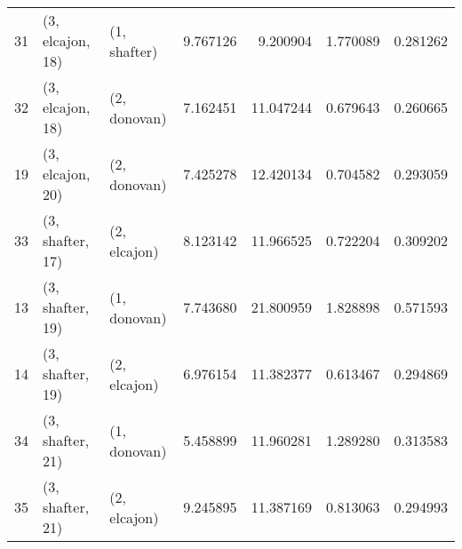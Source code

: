 \begin{tabular}{lllrrrr}
31 &  (3, elcajon, 18) &     (1, shafter) &   9.767126 &   9.200904 &   1.770089 &  0.281262 \\
32 &  (3, elcajon, 18) &     (2, donovan) &   7.162451 &  11.047244 &   0.679643 &  0.260665 \\
19 &  (3, elcajon, 20) &     (2, donovan) &   7.425278 &  12.420134 &   0.704582 &  0.293059 \\
33 &  (3, shafter, 17) &     (2, elcajon) &   8.123142 &  11.966525 &   0.722204 &  0.309202 \\
13 &  (3, shafter, 19) &     (1, donovan) &   7.743680 &  21.800959 &   1.828898 &  0.571593 \\
14 &  (3, shafter, 19) &     (2, elcajon) &   6.976154 &  11.382377 &   0.613467 &  0.294869 \\
34 &  (3, shafter, 21) &     (1, donovan) &   5.458899 &  11.960281 &   1.289280 &  0.313583 \\
35 &  (3, shafter, 21) &     (2, elcajon) &   9.245895 &  11.387169 &   0.813063 &  0.294993 \\
\bottomrule
\end{tabular}
